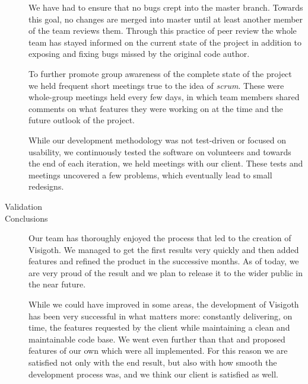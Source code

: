 \documentclass[a4paper,11pt,titlepage]{article}
\begin{document}
\begin{description}
    We have had to ensure that no bugs crept into the master branch. Towards
    this goal, no changes are merged into master until at least another member
    of the team reviews them. Through this practice of peer review the whole
    team has stayed informed on the current state of the project in addition to
    exposing and fixing bugs missed by the original code author.

    To further promote group awareness of the complete state of the project we
    held frequent short meetings true to the idea of \emph{scrum}. These were
    whole-group meetings held every few days, in which team members shared
    comments on what features they were working on at the time and the future
    outlook of the project.

    While our development methodology was not test-driven or focused on
    usability, we continuously tested the software on volunteers and towards the
    end of each iteration, we held meetings with our client. These tests and
    meetings uncovered a few problems, which eventually lead to small redesigns.

	\item[Validation]

	\item[Conclusions]

    Our team has thoroughly enjoyed the process that led to the creation of
    Visigoth. We managed to get the first results very quickly and then added
    features and refined the product in the successive months. As of today, we
    are very proud of the result and we plan to release it to the wider public
    in the near future.

    While we could have improved in some areas, the development of Visigoth has
    been very successful in what matters more: constantly delivering, on time,
    the features requested by the client while maintaining a clean and
    maintainable code base. We went even further than that and proposed features
    of our own which were all implemented. For this reason we are satisfied not
    only with the end result, but also with how smooth the development process
    was, and we think our client is satisfied as well.

\end{description}
\end{document}
